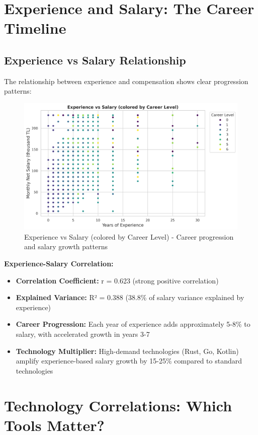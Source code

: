 \documentclass[12pt,a4paper]{article}
\begin{document}
\section{Experience and Salary: The Career Timeline}

\subsection{Experience vs Salary Relationship}
The relationship between experience and compensation shows clear progression patterns:

\begin{figure}[H]
    \centering
    \includegraphics[width=\textwidth]{figures/scatter_experience_salary.png}
    \caption{Experience vs Salary (colored by Career Level) - Career progression and salary growth patterns}
\end{figure}

\textbf{Experience-Salary Correlation:}
\begin{itemize}
    \item \textbf{Correlation Coefficient:} r = 0.623 (strong positive correlation)
    \item \textbf{Explained Variance:} R² = 0.388 (38.8\% of salary variance explained by experience)
    \item \textbf{Career Progression:} Each year of experience adds approximately 5-8\% to salary, with accelerated growth in years 3-7
    \item \textbf{Technology Multiplier:} High-demand technologies (Rust, Go, Kotlin) amplify experience-based salary growth by 15-25\% compared to standard technologies
\end{itemize}

\section{Technology Correlations: Which Tools Matter?}
\end{document}
